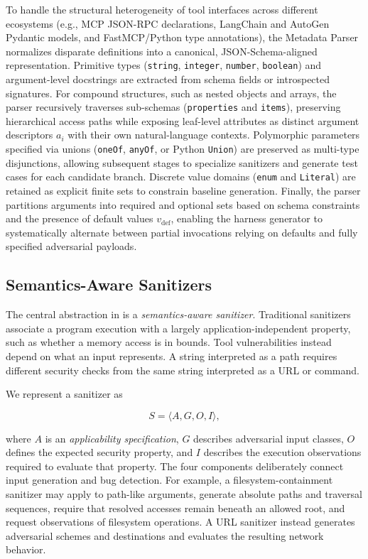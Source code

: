 To handle the structural heterogeneity of tool interfaces across different ecosystems (e.g., MCP JSON-RPC declarations, LangChain and AutoGen Pydantic models, and FastMCP/Python type annotations), the Metadata Parser normalizes disparate definitions into a canonical, JSON-Schema-aligned representation. Primitive types (\texttt{string}, \texttt{integer}, \texttt{number}, \texttt{boolean}) and argument-level docstrings are extracted from schema fields or introspected signatures. For compound structures, such as nested objects and arrays, the parser recursively traverses sub-schemas (\texttt{properties} and \texttt{items}), preserving hierarchical access paths while exposing leaf-level attributes as distinct argument descriptors $a_i$ with their own natural-language contexts. Polymorphic parameters specified via unions (\texttt{oneOf}, \texttt{anyOf}, or Python \texttt{Union}) are preserved as multi-type disjunctions, allowing subsequent stages to specialize sanitizers and generate test cases for each candidate branch. Discrete value domains (\texttt{enum} and \texttt{Literal}) are retained as explicit finite sets to constrain baseline generation. Finally, the parser partitions arguments into required and optional sets based on schema constraints and the presence of default values $v_{\text{def}}$, enabling the harness generator to systematically alternate between partial invocations relying on defaults and fully specified adversarial payloads.

\subsection{Semantics-Aware Sanitizers}
\label{sec:design-mapper}

The central abstraction in \project{} is a \emph{semantics-aware sanitizer}.
Traditional sanitizers associate a program execution with a largely
application-independent property, such as whether a memory access is in
bounds. Tool vulnerabilities instead depend on what an input represents. A
string interpreted as a path requires different security checks from the same
string interpreted as a URL or command.

We represent a sanitizer as

\[
S = \langle A,G,O,I\rangle ,
\]

where $A$ is an \emph{applicability specification}, $G$ describes adversarial
input classes, $O$ defines the expected security property, and $I$ describes
the execution observations required to evaluate that property. The four
components deliberately connect input generation and bug detection. For
example, a filesystem-containment sanitizer may apply to path-like arguments,
generate absolute paths and traversal sequences, require that resolved
accesses remain beneath an allowed root, and request observations of
filesystem operations. A URL sanitizer instead generates adversarial schemes
and destinations and evaluates the resulting network behavior.

